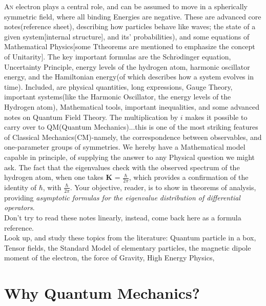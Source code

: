 \documentclass[a4paper, 10pt, onepage]{elegantbook}
\newcommand{\First}[1]{\noindent\textsc{#1}}
\begin{document}
\First{An} electron plays a central role, and can be assumed to move in a spherically symmetric field, where all binding Energies are negative. These are advanced core notes(reference sheet), describing how particles behave like waves; the state of a given system[internal structure], and its' probabilities),
and some equations of Mathematical Physics[some Ttheorems are mentioned to emphasize the concept of Unitarity].
The key important formulas are the Schr$\ddot{o}$dinger equation, 
Uncertainty Principle, energy levels of the hydrogen atom, harmonic oscillator energy,
and the Hamiltonian energy(of which describes how a system evolves in time). 
Included, are physical quantities, long expressions, Gauge Theory, 
important systems(like the Harmonic Oscillator, the energy levels of the Hydrogen atom), Mathematical tools, 
important inequalities, and some advanced notes on Quantum Field Theory. The multiplication by $i$ makes it possible
to carry over to QM(Quantum Mechanics)...this is one of the most striking features of Classical Mechanics(CM)-namely,
the correspondence between observables, and one-parameter groups of symmetries. We hereby have a Mathematical model
capable in principle, of supplying the answer to any Physical question we might ask. The fact that the eigenvalues check with
the observed spectrum of the hydrogen atom, when one takes $\mathbf K$ = $\frac{\hbar}{2 \pi}$, which provides a confirmation
of the identity of $\hbar$, with $\frac{\hbar}{2 \pi}$. Your objective, reader, is to show in theorems of analysis, providing
\emph{asymptotic formulas for the eigenvalue distribution of differential operators}. \\
Don't try to read these notes linearly, instead, come back here as a formula reference. \\

Look up, and study these topics from the literature: Quantum particle in a box, Tensor fields, the Standard Model of elementary particles, the magnetic dipole moment of the electron, the force of Gravity, High Energy Physics,

\newpage

\section{Why Quantum Mechanics?}
\end{document}
